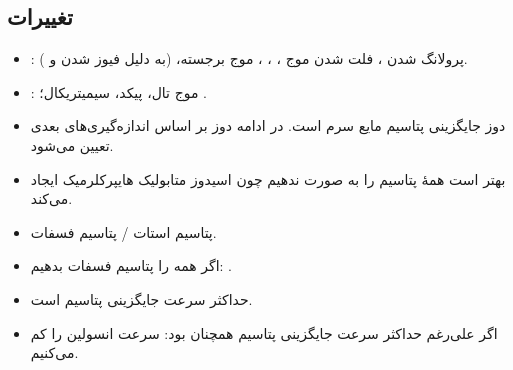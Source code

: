 \documentclass[12pt,a4paper]{article}
\begin{document}
\subsection*{تغییرات }
\begin{itemize}
\item {}: پرولانگ شدن ، فلت شدن موج ، ، ، موج  برجسته،  (به دلیل فیوز شدن  و ).
\item {}: موج  تال، پیکد، سیمیتریکال؛ .
\end{itemize}
\begin{itemize}
\item دوز جایگزینی پتاسیم  مایع سرم است. در ادامه دوز بر اساس اندازه‌گیری‌های بعدی تعیین می‌شود.
\item بهتر است همهٔ پتاسیم را به صورت  ندهیم چون اسیدوز متابولیک هایپرکلرمیک ایجاد می‌کند.
\item پتاسیم استات / پتاسیم فسفات.
\item اگر همه را پتاسیم فسفات بدهیم: .
\item حداکثر سرعت جایگزینی پتاسیم  است.
\item اگر علی‌رغم حداکثر سرعت جایگزینی پتاسیم همچنان  بود: سرعت انسولین را کم می‌کنیم.
\end{itemize}

\end{document}
